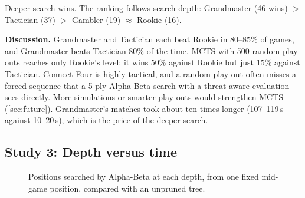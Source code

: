 \documentclass[11pt,a4paper]{article}
\begin{document}
\begin{keybox}[title=Finding 2]
Deeper search wins. The ranking follows search depth: Grandmaster (46 wins) $>$ Tactician (37) $>$ Gambler (19) $\approx$ Rookie (16).
\end{keybox}

\textbf{Discussion.} Grandmaster and Tactician each beat Rookie in 80--85\% of games, and Grandmaster beats Tactician 80\% of the time. MCTS with 500 random play-outs reaches only Rookie's level: it wins 50\% against Rookie but just 15\% against Tactician. Connect Four is highly tactical, and a random play-out often misses a forced sequence that a 5-ply Alpha-Beta search with a threat-aware evaluation sees directly. More simulations or smarter play-outs would strengthen MCTS (\cref{sec:future}). Grandmaster's matches took about ten times longer (107--119\,s against 10--20\,s), which is the price of the deeper search.

\subsection{Study 3: Depth versus time}

\begin{figure}[ht]
\centering
{}
\caption{Positions searched by Alpha-Beta at each depth, from one fixed mid-game position, compared with an unpruned tree.}
\label{fig:depth}
\end{figure}
\end{document}
